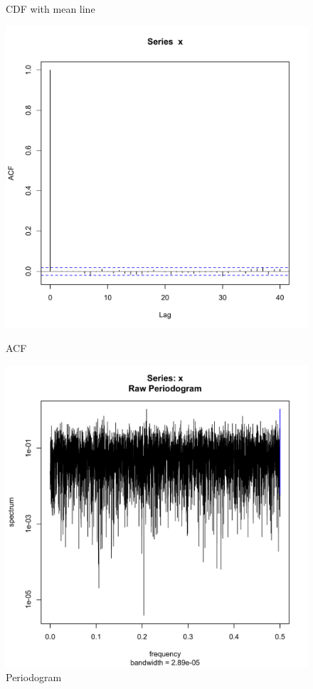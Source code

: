 \documentclass[11pt]{article}
\begin{document}
\begin{figure}[ht]
\begin{minipage}[b]{0.45\linewidth}
\caption{CDF with mean line}
\label{fig:figure2}
\end{minipage}

\begin{minipage}[b]{0.45\linewidth}
\centering
\includegraphics[scale=.42]{rACF.pdf}
\caption{ACF}
\label{fig:figure3}
\end{minipage}
\begin{minipage}[b]{0.45\linewidth}
\centering
\includegraphics[scale=.42]{rPgram.pdf}
\caption{Periodogram}
\label{fig:figure4}
\end{minipage}
\end{figure}
\end{document}
